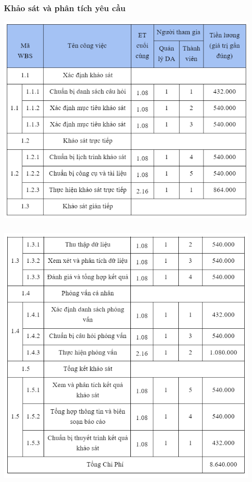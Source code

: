 \documentclass[12pt]{article}
\begin{document}
\subsubsection{Khảo sát và phân tích yêu cầu}
\includegraphics[width=15cm]{ChiPhi1.png}
\par
\hspace{-0.5cm}\includegraphics[width=15cm, height=14cm]{ChiPhi2.png}
\end{document}
